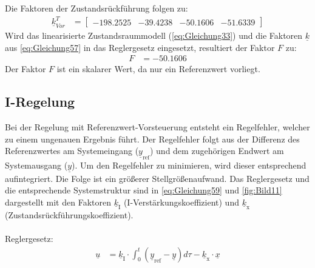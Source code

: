  Die Faktoren der Zustandsrückführung folgen zu:
 \begin{align} \label{eq:Gleichung57}
     \underline{k}^T_{Vor} &=
     \begin{bmatrix}
        -198.2525 & -39.4238 & -50.1606 & -51.6339
     \end{bmatrix}
 \end{align}
\newline
Wird das linearisierte Zustandsraummodell (\autoref{eq:Gleichung33}) und die Faktoren $\underline{k}$ aus \autoref{eq:Gleichung57} in das Reglergesetz eingesetzt, resultiert der Faktor $F$ zu:
\begin{align}\label{eq:Gleichung58}
    F &= -50.1606
\end{align}
\newline
Der Faktor $F$ ist ein skalarer Wert, da nur ein Referenzwert vorliegt.

\subsection{I-Regelung} \label{sec:iregler}
Bei der Regelung mit Referenzwert-Vorsteuerung entsteht ein Regelfehler, welcher zu einem ungenauen Ergebnis führt. Der Regelfehler folgt aus der Differenz des Referenzwertes am Systemeingang ($\underline{y}_{\mathrm{ref}}$) und dem zugehörigen Endwert am Systemausgang ($\underline{y}$). Um den Regelfehler zu minimieren, wird dieser entsprechend aufintegriert. Die Folge ist ein größerer Stellgrößenaufwand. Das Reglergesetz und die entsprechende Systemstruktur sind in \autoref{eq:Gleichung59} und \autoref{fig:Bild11} dargestellt mit den Faktoren $\underline{k}_{\mathrm{I}}$ (I-Verstärkungskoeffizient) und $\underline{k}_{\mathrm{x}}$ (Zustandsrückführungskoeffizient).\\\\
Reglergesetz:
\begin{align}\label{eq:Gleichung59}
    \underline{u} &= \underline{k}_{\mathrm{I}}\cdot\int_{0}^t(\underline{y}_{\mathrm{ref}}-\underline{y})d\tau-\underline{k}_{\mathrm{x}}\cdot\underline{x}
\end{align}

